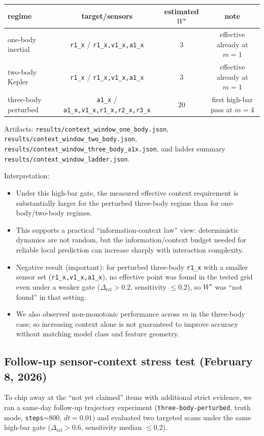 \documentclass[11pt]{article}
\begin{document}
\begin{center}
\begin{tabular}{lccc}
\hline
regime & target/sensors & estimated $W^\star$ & note \\
\hline
one-body inertial & \texttt{r1\_x} / \texttt{r1\_x,v1\_x,a1\_x} & $3$ & effective already at $m=1$ \\
two-body Kepler & \texttt{r1\_x} / \texttt{r1\_x,v1\_x,a1\_x} & $3$ & effective already at $m=1$ \\
three-body perturbed & \texttt{a1\_x} / \texttt{a1\_x,v1\_x,r1\_x,r2\_x,r3\_x} & $20$ & first high-bar pass at $m=4$ \\
\hline
\end{tabular}
\end{center}

Artifacts: \texttt{results/context\_window\_one\_body.json}, \texttt{results/context\_window\_two\_body.json}, \texttt{results/context\_window\_three\_body\_a1x.json}, and ladder summary \texttt{results/context\_window\_ladder.json}.

Interpretation:
\begin{itemize}
\item Under this high-bar gate, the measured effective context requirement is substantially larger for the perturbed three-body regime than for one-body/two-body regimes.
\item This supports a practical ``information-context law'' view: deterministic dynamics are not random, but the information/context budget needed for reliable local prediction can increase sharply with interaction complexity.
\item Negative result (important): for perturbed three-body \texttt{r1\_x} with a smaller sensor set (\texttt{r1\_x,v1\_x,a1\_x}), no effective point was found in the tested grid even under a weaker gate ($\Delta_{\mathrm{rel}}>0.2$, sensitivity $\le 0.2$), so $W^\star$ was ``not found'' in that setting.
\item We also observed non-monotonic performance across $m$ in the three-body case; so increasing context alone is not guaranteed to improve accuracy without matching model class and feature geometry.
\end{itemize}

\subsection{Follow-up sensor-context stress test (February 8, 2026)}
To chip away at the ``not yet claimed'' items with additional strict evidence, we ran a same-day follow-up trajectory experiment (\texttt{three-body-perturbed}, truth mode, \texttt{steps}=800, $dt=0.01$) and evaluated two targeted scans under the same high-bar gate ($\Delta_{\mathrm{rel}}>0.6$, sensitivity median $\le 0.2$).
\end{document}
